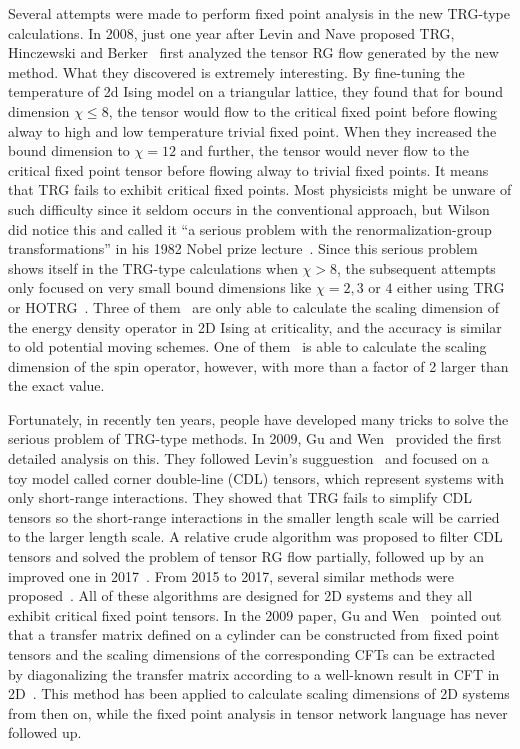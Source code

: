 \documentclass[aps,prb,reprint,superscriptaddress]{revtex4-2}
\begin{document}
Several attempts were made to perform fixed point analysis in the new
TRG-type calculations. In 2008, just one year after Levin and Nave
proposed TRG, Hinczewski and Berker~\cite{Berker2008} first analyzed the
tensor RG flow generated by the new method. What they discovered is
extremely interesting.  By fine-tuning the temperature of 2d Ising model
on a triangular lattice, they found that for bound dimension $\chi \leq
8$, the tensor would flow to the critical fixed point before flowing
alway to high and low temperature trivial fixed point. When they
increased the bound dimension to $\chi =  12$ and further, the tensor
would never flow to the critical fixed point tensor before flowing alway
to trivial fixed points. It means that TRG fails to exhibit critical
fixed points. Most physicists might be unware of such difficulty since
it seldom occurs in the conventional approach, but Wilson did notice
this and called it ``a serious problem with the renormalization-group
transformations'' in his 1982 Nobel prize lecture~\cite{wilsonNobel}.
Since this serious problem shows itself in the TRG-type calculations
when $\chi > 8$, the subsequent attempts only focused on very small
bound dimensions like $\chi = 2, 3$ or $4$ either using
TRG~\cite{kadanoff2014,aoki2009} or HOTRG~\cite{meurice2013}. Three of
them~\cite{Berker2008,aoki2009,meurice2013} are only able to calculate
the scaling dimension of the energy density operator in 2D Ising at
criticality, and the accuracy is similar to old potential moving
schemes. One of them~\cite{kadanoff2014} is able to calculate the
scaling dimension of the spin operator, however, with more than a factor
of 2 larger than the exact value. 
%

Fortunately, in recently ten years, people have developed many tricks to
solve the serious problem of TRG-type methods. In 2009, Gu and
Wen~\cite{GuWen2009} provided the first detailed analysis on this. They
followed Levin's sugguestion~\cite{trg,LevinTalk} and focused on a toy
model called corner double-line (CDL) tensors, which represent systems
with only short-range interactions. They showed that TRG fails to
simplify CDL tensors so the short-range interactions in the smaller
length scale will be carried to the larger length scale. A relative
crude algorithm was proposed to filter CDL tensors and solved the
problem of tensor RG flow partially, followed up by an improved one in
2017~\cite{looptnr}. From 2015 to 2017, several similar methods were
proposed~\cite{tnr,tnralgo,tnrplus}. All of these algorithms are
designed for 2D systems and they all exhibit critical fixed point
tensors. In the 2009 paper, Gu and Wen~\cite{GuWen2009} pointed out that
a transfer matrix defined on a cylinder can be constructed from fixed
point tensors and the scaling dimensions of the corresponding CFTs can
be extracted by diagonalizing the transfer matrix according to a
well-known result in CFT in 2D~\cite{cardy1986}.  This method has been
applied to calculate scaling dimensions of 2D systems from then on,
while the fixed point analysis in tensor network language has never
followed up.
%
\end{document}
